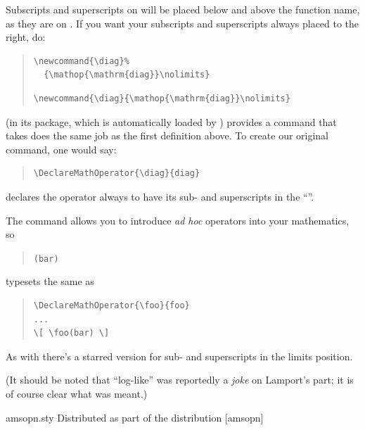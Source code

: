 Subscripts and superscripts on  will be placed below and
above the function name, as they are on
.  If you want your subscripts and superscripts always placed
to the right, do:
\begin{quote}
\begin{narrowversion}
\begin{verbatim}
\newcommand{\diag}%
  {\mathop{\mathrm{diag}}\nolimits}
\end{verbatim}
\end{narrowversion}
\begin{wideversion}
\begin{verbatim}
\newcommand{\diag}{\mathop{\mathrm{diag}}\nolimits}
\end{verbatim}
\end{wideversion}
\end{quote}

\AMSLaTeX{} (in its  package, which is automatically
loaded by ) provides a command
 that takes does the same job as the first
definition above.  To create our original  command, one would
say:
\begin{quote}
\begin{verbatim}
\DeclareMathOperator{\diag}{diag}
\end{verbatim}
\end{quote}
 declares the operator always to have its
sub- and superscripts in the %
``''.

The  command  allows you to
introduce \emph{ad hoc} operators into your mathematics, so
\begin{quote}
  \csx{[} \texttt{(bar)} \csx{]}
\end{quote}
typesets the same as
\begin{quote}
\begin{verbatim}
\DeclareMathOperator{\foo}{foo}
...
\[ \foo(bar) \]
\end{verbatim}
\end{quote}
As with  there's a starred version
 for sub- and superscripts in the limits position.

(It should be noted that ``log-like'' was reportedly a \emph{joke} on
Lamport's part; it is of course clear what was meant.)
\begin{ctanrefs}
\item[amsopn.sty]Distributed as part of the \AMSLaTeX{} distribution
  [amsopn]
\end{ctanrefs}

